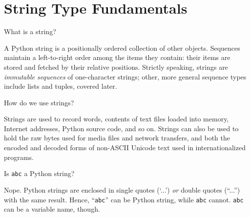 \documentclass[a4paper,11pt]{book}
\numberwithin{figure}{chapter}
\numberwithin{table}{chapter}
\newcommand{\question}[1]{%
    \begin{tcolorbox}[colback=comp_c!10,colframe=comp_c,sidebyside align=top,width=\linewidth,before skip=1ex]
        #1
    \end{tcolorbox}%
    \switchcolumn%
}
\newcommand{\note}[1]{%
    \begin{tcolorbox}[colback=white!0,colframe=white!10,width=\linewidth,before skip=1ex]
        #1
    \end{tcolorbox}         
}
\begin{document}
\section{String Type Fundamentals}

\begin{paracol}{2}
	\question{What is a string?}
	\note{A Python string is a positionally ordered collection of other objects. Sequences maintain a left-to-right order among the items they contain: their items are stored and fetched by their relative positions. Strictly speaking, strings are \textit{immutable sequences} of one-character strings; other, more general sequence types include lists and tuples, covered later.}
\end{paracol}

\begin{paracol}{2}
	\question{How do we use strings?}
	\note{Strings are used to record words, contents of text files loaded into memory, Internet addresses, Python source code, and so on. Strings can also be used to hold the raw bytes used for media files and network transfers, and both the encoded and decoded forms of non-ASCII Unicode text used in internationalized programs.}
\end{paracol}

\begin{paracol}{2}
	\question{Is \texttt{abc} a Python string?}
	\note{Nope. Python strings are enclosed in single quotes (`...') \textit{or} double quotes (``...'') with the same result. Hence, ``\texttt{abc}'' can be Python string, while \texttt{abc} cannot. \texttt{abc} can be a variable name, though.}
\end{paracol}
\end{document}
